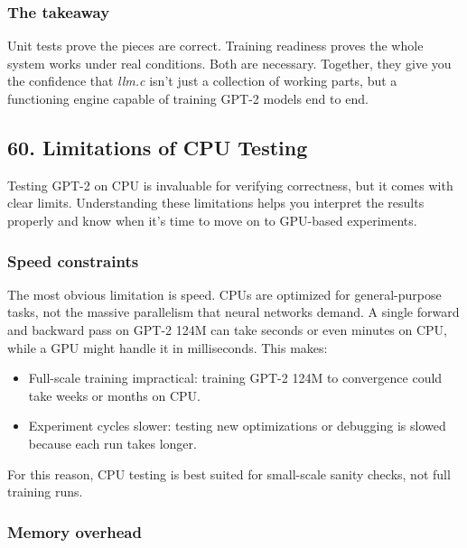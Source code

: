 \documentclass[
  letterpaper,
  DIV=11,
  numbers=noendperiod]{scrreprt}
\providecommand{\tightlist}{%
  \setlength{\itemsep}{0pt}\setlength{\parskip}{0pt}}
\begin{document}
\subsubsection{The takeaway}\label{the-takeaway-48}

Unit tests prove the pieces are correct. Training readiness proves the
whole system works under real conditions. Both are necessary. Together,
they give you the confidence that \emph{llm.c} isn't just a collection
of working parts, but a functioning engine capable of training GPT-2
models end to end.

\subsection{60. Limitations of CPU
Testing}\label{limitations-of-cpu-testing}

Testing GPT-2 on CPU is invaluable for verifying correctness, but it
comes with clear limits. Understanding these limitations helps you
interpret the results properly and know when it's time to move on to
GPU-based experiments.

\subsubsection{Speed constraints}\label{speed-constraints}

The most obvious limitation is speed. CPUs are optimized for
general-purpose tasks, not the massive parallelism that neural networks
demand. A single forward and backward pass on GPT-2 124M can take
seconds or even minutes on CPU, while a GPU might handle it in
milliseconds. This makes:

\begin{itemize}
\tightlist
\item
  Full-scale training impractical: training GPT-2 124M to convergence
  could take weeks or months on CPU.
\item
  Experiment cycles slower: testing new optimizations or debugging is
  slowed because each run takes longer.
\end{itemize}

For this reason, CPU testing is best suited for small-scale sanity
checks, not full training runs.

\subsubsection{Memory overhead}\label{memory-overhead}
\end{document}
